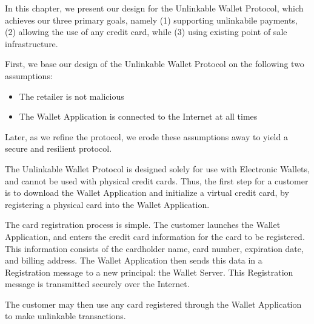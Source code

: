 In this chapter, we present our design for the Unlinkable Wallet Protocol, which achieves our three primary goals, namely
    (1) supporting unlinkabile payments,
    (2) allowing the use of any credit card,
    while (3) using existing point of sale infrastructure.

First, we base our design of the Unlinkable Wallet Protocol on the following two assumptions:
\begin{itemize}
\item The retailer is not malicious
\item The Wallet Application is connected to the Internet at all times
\end{itemize}
Later, as we refine the protocol, we erode these assumptions away to yield a secure and resilient protocol.

The Unlinkable Wallet Protocol is designed solely for use with Electronic Wallets, and cannot be used with physical credit cards.
Thus, the first step for a customer is to download the Wallet Application and initialize a virtual credit card,
     by registering a physical card into the Wallet Application.

The card registration process is simple.
The customer launches the Wallet Application, and enters the credit card information for the card to be registered.
This information consists of the cardholder name, card number, expiration date, and billing address.
The Wallet Application then sends this data in a Registration message to a new principal: the Wallet Server.
This Registration message is transmitted securely over the Internet.

The customer may then use any card registered through the Wallet Application to make unlinkable transactions.
